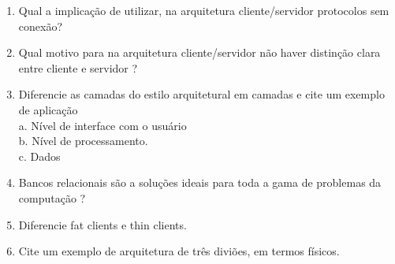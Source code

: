 \documentclass[12pt]{article} %
\begin{document}
\begin{enumerate}
	\item Qual a implicação de utilizar, na arquitetura cliente/servidor protocolos sem conexão?
	\item Qual motivo para na arquitetura cliente/servidor não haver distinção clara  entre cliente e servidor ?
	\item Diferencie as camadas do estilo arquitetural em camadas e cite um exemplo de aplicação\\
a. Nível de interface com o usuário\\
b. Nível de processamento.\\
c. Dados
	\item Bancos relacionais são a soluções ideais para toda a gama de problemas da computação ?
	\item Diferencie fat clients e thin clients.
	\item Cite um exemplo de arquitetura de três diviões, em termos físicos.

\end{enumerate}
\end{document}
